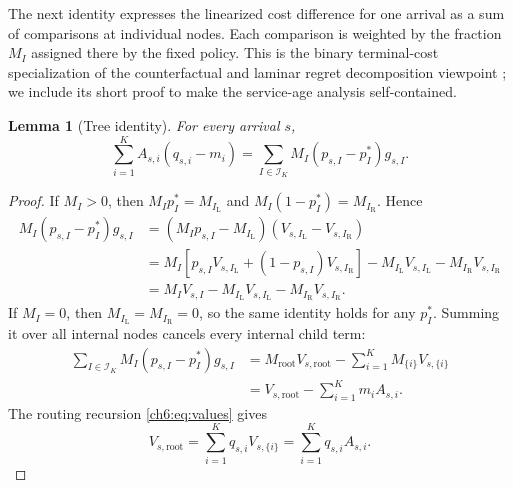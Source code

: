 \documentclass[11pt]{article}
\theoremstyle{plain}
\newtheorem{Thm:Lemma}[Thm:Theorem]{Lemma}
\theoremstyle{remark}
\numberwithin{equation}{section}
\begin{document}
The next identity expresses the linearized cost difference for one
arrival as a sum of comparisons at individual nodes. Each comparison is
weighted by the fraction $M_I$ assigned there by the fixed policy.
This is the binary terminal-cost specialization of the counterfactual
and laminar regret decomposition viewpoint
\cite{zinkevich2007counterfactual,farina2019laminar}; we include its
short proof to make the service-age analysis self-contained.

\begin{Thm:Lemma}[Tree identity]\label{ch6:lem:tree}
For every arrival $s$,
\begin{equation}\label{ch6:eq:tree-identity}
 \sum_{i=1}^KA_{s,i}(q_{s,i}-m_i)
 =\sum_{I\in\mathcal{I}_K}M_I(p_{s,I}-p_I^*)g_{s,I}.
\end{equation}
\end{Thm:Lemma}
\begin{proof}
If $M_I>0$, then $M_Ip_I^*=M_{I_{\mathrm{L}}}$ and
$M_I(1-p_I^*)=M_{I_{\mathrm{R}}}$.  Hence
\begin{align*}
M_I(p_{s,I}-p_I^*)g_{s,I}
&=(M_Ip_{s,I}-M_{I_{\mathrm{L}}})
  (V_{s,I_{\mathrm{L}}}-V_{s,I_{\mathrm{R}}})\\
&=M_I\!\left[p_{s,I}V_{s,I_{\mathrm{L}}}
 +(1-p_{s,I})V_{s,I_{\mathrm{R}}}\right]
  -M_{I_{\mathrm{L}}}V_{s,I_{\mathrm{L}}}-M_{I_{\mathrm{R}}}V_{s,I_{\mathrm{R}}}\\
&=M_IV_{s,I}-M_{I_{\mathrm{L}}}V_{s,I_{\mathrm{L}}}-M_{I_{\mathrm{R}}}V_{s,I_{\mathrm{R}}}.
\end{align*}
If $M_I=0$, then $M_{I_{\mathrm{L}}}=M_{I_{\mathrm{R}}}=0$, so the same identity holds for
any $p_I^*$.  Summing it over all internal nodes cancels every internal
child term:
\begin{align*}
\sum_{I\in\mathcal I_K}M_I(p_{s,I}-p_I^*)g_{s,I}
&=M_{\mathrm{root}}V_{s,\mathrm{root}}
  -\sum_{i=1}^{K}M_{\{i\}}V_{s,\{i\}}\\
&=V_{s,\mathrm{root}}-\sum_{i=1}^{K}m_iA_{s,i}.
\end{align*}
The routing recursion \eqref{ch6:eq:values} gives
\[
V_{s,\mathrm{root}}=\sum_{i=1}^{K}q_{s,i}V_{s,\{i\}}
=\sum_{i=1}^{K}q_{s,i}A_{s,i}.
\]
\end{proof}
\end{document}
